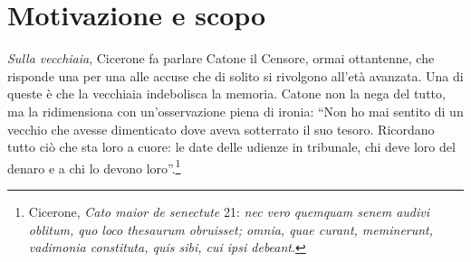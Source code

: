 %
\chapter{Motivazione e scopo}
\label{cap:motivazione}


 \emph{Sulla vecchiaia}, Cicerone fa parlare
Catone il Censore, ormai ottantenne, che risponde una per una alle
accuse che di solito si rivolgono all'età avanzata. Una di queste è
che la vecchiaia indebolisca la memoria. Catone non la nega del tutto,
ma la ridimensiona con un'osservazione piena di ironia: \enquote{Non ho
mai sentito di un vecchio che avesse dimenticato dove aveva sotterrato
il suo tesoro. Ricordano tutto ciò che sta loro a cuore: le date delle
udienze in tribunale, chi deve loro del denaro e a chi lo devono
loro}.\footnote{Cicerone, \emph{Cato maior de senectute} 21:
\emph{nec vero quemquam senem audivi oblitum, quo loco thesaurum
obruisset; omnia, quae curant, meminerunt, vadimonia constituta, quis
sibi, cui ipsi debeant}.}

